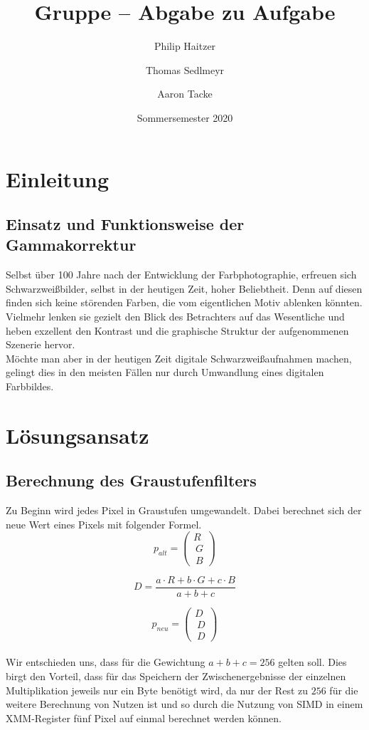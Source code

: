 \documentclass[course=erap]{aspdoc}
\author{Philip Haitzer \and Thomas Sedlmeyr \and Aaron Tacke}
\date{Sommersemester 2020} %
\title{Gruppe \theGroup{} -- Abgabe zu Aufgabe \theNumber}
\begin{document}
\maketitle

\section{Einleitung}
\subsection{Einsatz und Funktionsweise der Gammakorrektur}
Selbst über 100 Jahre nach der Entwicklung der Farbphotographie, erfreuen sich Schwarzweißbilder, selbst in der heutigen Zeit, hoher Beliebtheit. Denn auf diesen finden sich keine störenden Farben, die vom eigentlichen Motiv ablenken könnten. Vielmehr lenken sie gezielt den Blick des Betrachters auf das Wesentliche und heben exzellent den Kontrast und die graphische Struktur der aufgenommenen Szenerie hervor. 
\\
\newline
Möchte man aber in der heutigen Zeit digitale Schwarzweißaufnahmen machen, gelingt dies in den meisten Fällen nur durch Umwandlung eines digitalen Farbbildes.   


\section{Lösungsansatz}
\subsection{Berechnung des Graustufenfilters}
Zu Beginn wird jedes Pixel in Graustufen umgewandelt. Dabei berechnet sich der neue Wert eines Pixels mit folgender Formel.
\begin{equation}
p_{alt} =  \begin{pmatrix}R \\\ G \\\ B \end{pmatrix}
\end{equation}

\begin{equation}
D = \frac{a \cdot R  + b \cdot G  + c \cdot B }{a + b + c}
\end{equation}   

\begin{equation}
p_{neu} =  \begin{pmatrix}D \\\ D \\\ D \end{pmatrix}
\end{equation}	
\\
Wir entschieden uns, dass für die Gewichtung $a + b + c = 256$ gelten soll. Dies birgt den Vorteil, dass für das Speichern der Zwischenergebnisse der einzelnen Multiplikation jeweils nur ein Byte benötigt wird, da nur der Rest zu $256$ für die weitere Berechnung von Nutzen ist und so durch die Nutzung von SIMD in einem XMM-Register fünf Pixel auf einmal berechnet werden können.    
\end{document}
